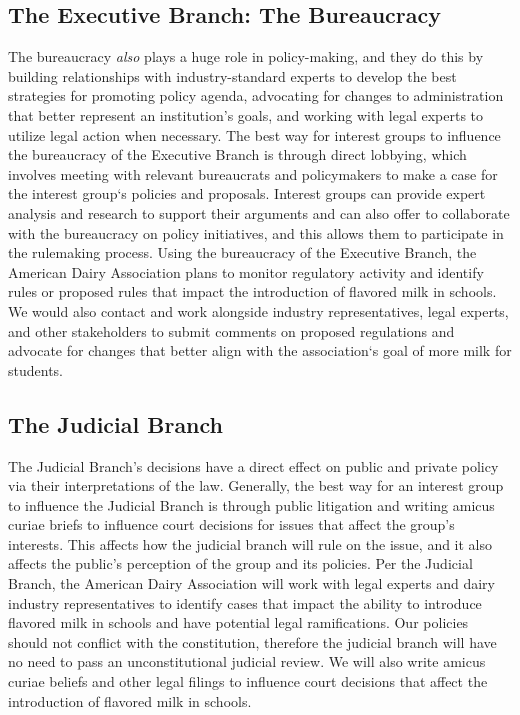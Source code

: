 \documentclass[a4paper, 12pt]{article}
\begin{document}
\subsection{The Executive Branch: The Bureaucracy}
\hspace{\parindent} The bureaucracy \emph{also} plays a huge role in policy-making, and they do this by building relationships with industry-standard experts to develop the best strategies for promoting policy agenda, advocating for changes to administration that better represent an institution's goals, and working with legal experts to utilize legal action when necessary. The best way for interest groups to influence the bureaucracy of the Executive Branch is through direct lobbying, which involves meeting with relevant bureaucrats and policymakers to make a case for the interest group`s policies and proposals. Interest groups can provide expert analysis and research to support their arguments and can also offer to collaborate with the bureaucracy on policy initiatives, and this allows them to participate in the rulemaking process. Using the bureaucracy of the Executive Branch, the American Dairy Association plans to monitor regulatory activity and identify rules or proposed rules that impact the introduction of flavored milk in schools. We would also contact and work alongside industry representatives, legal experts, and other stakeholders to submit comments on proposed regulations and advocate for changes that better align with the association`s goal of more milk for students.

\subsection{The Judicial Branch}
\hspace{\parindent} The Judicial Branch's decisions have a direct effect on public and private policy via their interpretations of the law. Generally, the best way for an interest group to influence the Judicial Branch is through public litigation and writing amicus curiae briefs to influence court decisions for issues that affect the group's interests. This affects how the judicial branch will rule on the issue, and it also affects the public's perception of the group and its policies. Per the Judicial Branch, the American Dairy Association will work with legal experts and dairy industry representatives to identify cases that impact the ability to introduce flavored milk in schools and have potential legal ramifications. Our policies should not conflict with the constitution, therefore the judicial branch will have no need to pass an unconstitutional judicial review. We will also write amicus curiae beliefs and other legal filings to influence court decisions that affect the introduction of flavored milk in schools.
\end{document}
